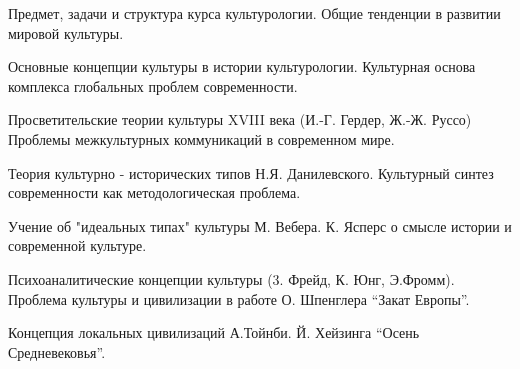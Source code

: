 \documentclass[
	14pt,
	a4paper,
	]
	{scrartcl}
\begin{document}
\shapk
{}
\setcounter{zad}{0}

\vfill
\z Предмет, задачи и структура курса культурологии.
 \vfill
\z Общие тенденции в развитии мировой культуры. \vfill

\vfill

\newpage


\shapk
{}
\setcounter{zad}{0}

\vfill
\z Основные концепции культуры в истории культурологии.
 \vfill
\z Культурная основа комплекса глобальных проблем современности.
 \vfill

\vfill

\newpage


\shapk
{}
\setcounter{zad}{0}

\vfill
\z Просветительские теории культуры XVIII века (И.-Г. Гердер, Ж.-Ж. Руссо)
 \vfill
\z Проблемы межкультурных коммуникаций в современном мире.
 \vfill

\vfill

\newpage


\shapk
{}
\setcounter{zad}{0}

\vfill
\z Теория культурно - исторических типов Н.Я. Данилевского.
 \vfill
\z Культурный синтез современности как методологическая проблема.
 \vfill

\vfill

\newpage


\shapk
{}
\setcounter{zad}{0}

\vfill
\z Учение об "идеальных типах" культуры М. Вебера.
 \vfill
\z К. Ясперс о смысле истории и современной культуре.
 \vfill

\vfill

\newpage


\shapk
{}
\setcounter{zad}{0}

\vfill
\z Психоаналитические концепции культуры (3. Фрейд, К. Юнг, Э.Фромм).
 \vfill
\z Проблема культуры и цивилизации в работе О. Шпенглера “Закат Европы”.
 \vfill

\vfill

\newpage


\shapk
{}
\setcounter{zad}{0}

\vfill
\z Концепция локальных цивилизаций А.Тойнби.
 \vfill
\z Й. Хейзинга “Осень Средневековья”.
 \vfill

\vfill

\newpage
\end{document}
